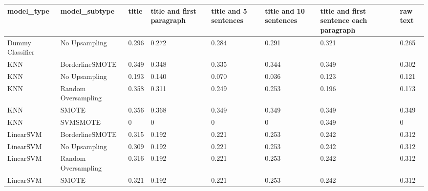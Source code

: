 \begin{tabular}{llllllll}
\toprule
                  model\_type &       model\_subtype & title & title and first paragraph & title and 5 sentences & title and 10 sentences & title and first sentence each paragraph &  raw text \\
\midrule
            Dummy Classifier &       No Upsampling & 0.296 &                     0.272 &                 0.284 &                  0.291 &                                   0.321 &     0.265 \\
                         KNN &     BorderlineSMOTE & 0.349 &                     0.348 &                 0.335 &                  0.344 &                                   0.349 &     0.302 \\
                         KNN &       No Upsampling & 0.193 &                     0.140 &                 0.070 &                  0.036 &                                   0.123 &     0.121 \\
                         KNN & Random Oversampling & 0.358 &                     0.311 &                 0.249 &                  0.253 &                                   0.196 &     0.173 \\
                         KNN &               SMOTE & 0.356 &                     0.368 &                 0.349 &                  0.349 &                                   0.349 &     0.349 \\
                         KNN &            SVMSMOTE &     0 &                         0 &                     0 &                      0 &                                   0.349 &         0 \\
                   LinearSVM &     BorderlineSMOTE & 0.315 &                     0.192 &                 0.221 &                  0.253 &                                   0.242 &     0.312 \\
                   LinearSVM &       No Upsampling & 0.309 &                     0.192 &                 0.221 &                  0.253 &                                   0.242 &     0.312 \\
                   LinearSVM & Random Oversampling & 0.316 &                     0.192 &                 0.221 &                  0.253 &                                   0.242 &     0.312 \\
                   LinearSVM &               SMOTE & 0.321 &                     0.192 &                 0.221 &                  0.253 &                                   0.242 &     0.312 \\

\end{tabular}
